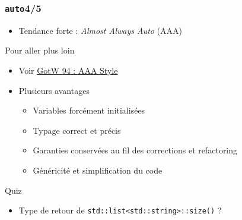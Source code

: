 \documentclass[C++.tex]{subfiles}
\begin{document}
\begin{frame}[fragile]
	\frametitle{\lstinline|auto|\titlehfill{}4/5}
	\begin{itemize}
		\item Tendance forte : \textit{Almost Always Auto} (AAA)
	\end{itemize}

	\begin{block}{Pour aller plus loin}
		\begin{itemize}
			\item Voir \href{https://herbsutter.com/2013/08/12/gotw-94-solution-aaa-style-almost-always-auto/}{GotW 94 : AAA Style}
		\end{itemize}
	\end{block}

	\begin{itemize}
		\item Plusieurs avantages
		\begin{itemize}
			\item Variables forcément initialisées
			\item Typage correct et précis
			\item Garanties conservées au fil des corrections et refactoring
			\item Généricité et simplification du code
		\end{itemize}
	\end{itemize}

	\pause
	
	\begin{block}{Quiz}
		\begin{itemize}
			\item Type de retour de \lstinline|std::list<std::string>::size()| ?
		\end{itemize}
	\end{block}
\end{frame}
\end{document}
